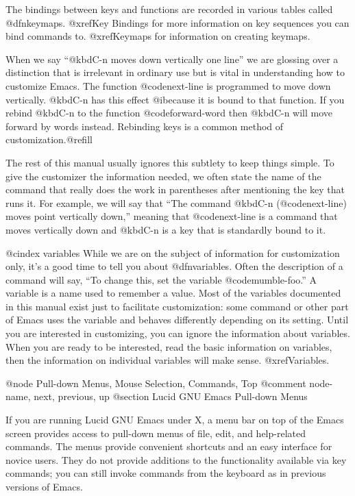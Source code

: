 {{  The bindings between keys and functions are recorded in various tables
called @dfn{keymaps}.  @xref{Key Bindings} for more information on key
sequences you can bind commands to.  @xref{Keymaps} for information on
creating keymaps.

  When we say  ``@kbd{C-n} moves down vertically one line'' we are
glossing over a distinction that is irrelevant in ordinary use but is
vital in understanding how to customize Emacs.  The function
@code{next-line} is programmed to move down vertically.  @kbd{C-n}
has this effect @i{because} it is bound to that function.  If you rebind
@kbd{C-n} to the function @code{forward-word} then @kbd{C-n} will move
forward by words instead.  Rebinding keys is a common method of
customization.@refill

   The rest of this manual usually ignores this subtlety to keep
things simple.  To give the customizer the information needed, we often
state the name of the command that really does the work in parentheses
after mentioning the key that runs it.  For example, we will say that
``The command @kbd{C-n} (@code{next-line}) moves point vertically
down,'' meaning that @code{next-line} is a command that moves vertically
down and @kbd{C-n} is a key that is standardly bound to it.

@cindex variables
  While we are on the subject of information for customization only,
it's a good time to tell you about @dfn{variables}.  Often the
description of a command will say, ``To change this, set the variable
@code{mumble-foo}.''  A variable is a name used to remember a value.
Most of the variables documented in this manual exist just to facilitate
customization: some command or other part of Emacs uses the variable
and behaves differently depending on its setting.  Until you are interested in
customizing, you can ignore the information about variables.  When you
are ready to be interested, read the basic information on variables,
then the information on individual variables will make sense.
@xref{Variables}.

@node Pull-down Menus, Mouse Selection, Commands, Top
@comment  node-name,  next,  previous,  up
@section Lucid GNU Emacs Pull-down Menus 

If you are running Lucid GNU Emacs under X, a menu bar on top of the
Emacs screen provides access to pull-down menus of file, edit, and
help-related commands. The menus provide convenient shortcuts and an
easy interface for novice users.  They do not provide additions to the
functionality available via key commands; you can still invoke commands
from the keyboard as in previous versions of Emacs.
        
}}
